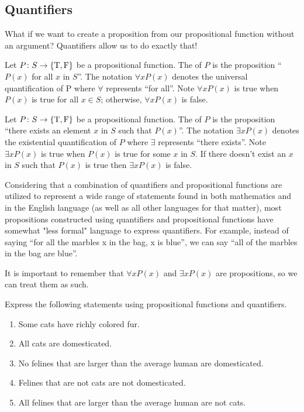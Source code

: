 \documentclass[../notes.tex]{subfiles}
\begin{document}
\subsection{Quantifiers}
What if we want to create a proposition from our propositional function without an argument? {Quantifiers} allow us to do exactly that!
\begin{definition}
    Let $P\colon S \rightarrow \{\text T,\text F\}$ be a propositional function. The  of $P$ is the proposition ``$P(x)$ for all $x $ in $S$''. The notation $\forall xP(x)$ denotes the universal quantification of P where $\forall$ represents ``for all''. Note $\forall xP(x)$ is true when $P(x)$ is true for all $x \in S$; otherwise, $\forall x P(x)$ is false.
\end{definition}
\begin{definition}
    Let $P\colon S \rightarrow \{\text T,\text F\}$ be a propositional function. The  of $P$ is the proposition ``there exists an element $x$ in $S$ such that $P(x)$''. The notation $\exists x P(x)$ denotes the existential quantification of $P$ where $\exists $ represents ``there exists''. Note $\exists x P(x)$ is true when $P(x)$ is true for some $x$ in $S$. If there doesn't exist an $x$ in $S$ such that $P(x)$ is true then $\exists x P(x)$ is false.
\end{definition}
\begin{remark}
    Considering that a combination of quantifiers and propositional functions are utilized to represent a wide range of statements found in both mathematics and in the English language (as well as all other languages for that matter), most propositions constructed using quantifiers and propositional functions have somewhat "less formal" language to express quantifiers. For example, instead of saying ``for all the marbles x in the bag, x is blue'', we can say ``all of the marbles in the bag are blue''. 
\end{remark}
It is important to remember that $\forall x P(x)$ and $\exists x P(x)$ are propositions, so we can treat them as such.
\begin{example}
    Express the following statements using propositional functions and quantifiers.
    \begin{enumerate}[label=(\alph*)]
        \item Some cats have richly colored fur. 
        \item All cats are domesticated. 
        \item No felines that are larger than the average human are domesticated.
        \item Felines that are not cats are not domesticated.
        \item All felines that are larger than the average human are not cats.
    \end{enumerate}
\end{example}
\end{document}

